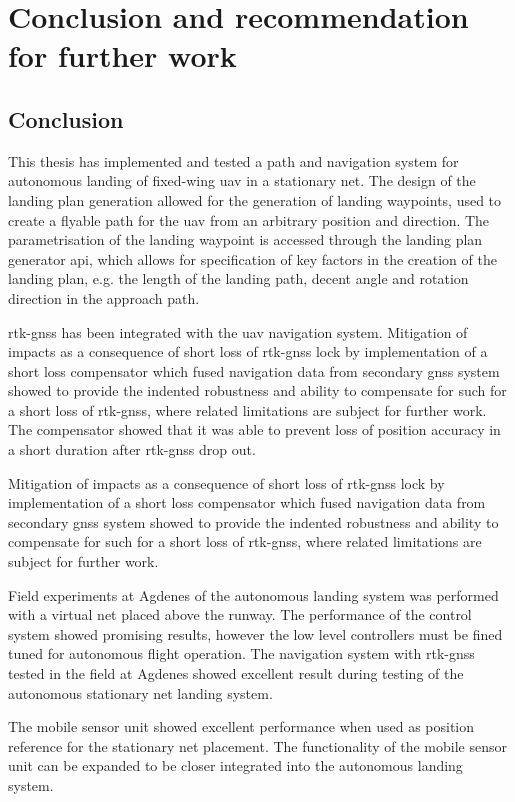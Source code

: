 \chapter{Conclusion and recommendation for further work}
\section{Conclusion}
This thesis has implemented and tested a path and navigation system for autonomous landing of fixed-wing \gls{uav} in a stationary net. The design of the landing plan generation allowed for the generation of landing waypoints, used to create a flyable path for the \gls{uav} from an arbitrary position and direction. The parametrisation of the landing waypoint is accessed through the landing plan generator \gls{api}, which allows for specification of key factors in the creation of the landing plan, e.g. the length of the landing path, decent angle and rotation direction in the approach path.

\gls{rtk-gnss} has been integrated with the \gls{uav} navigation system. Mitigation of impacts as a consequence of short loss of \gls{rtk-gnss} lock by implementation of a short loss compensator which fused navigation data from secondary \gls{gnss} system showed to provide the indented robustness and ability to compensate for such for a short loss of \gls{rtk-gnss}, where related limitations are subject for further work. The compensator showed that it was able to prevent loss of position accuracy in a short duration after \gls{rtk-gnss} drop out.

Mitigation of impacts as a consequence of short loss of \gls{rtk-gnss} lock by implementation of a short loss compensator which fused navigation data from secondary \gls{gnss} system showed to provide the indented robustness and ability to compensate for such for a short loss of \gls{rtk-gnss}, where related limitations are subject for further work.

Field experiments at Agdenes of the autonomous landing system was performed with a virtual net placed above the runway. The performance of the control system showed promising results, however the low level controllers must be fined tuned for autonomous flight operation. The navigation system with \gls{rtk-gnss} tested in the field at Agdenes showed excellent result during testing of the autonomous stationary net landing system.

The mobile sensor unit showed excellent performance when used as position reference for the stationary net placement. The functionality of the mobile sensor unit can be expanded to be closer integrated into the autonomous landing system.

